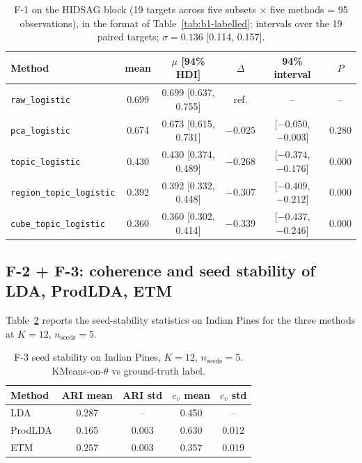 \documentclass[journal,a4paper,10pt]{IEEEtran}
\begin{document}
\begin{table}[t]
\caption{F-1 on the HIDSAG block (19 targets across five subsets
$\times$ five methods = 95 observations), in the format of
Table~\ref{tab:b1-labelled}; intervals over the 19 paired targets;
$\sigma = 0.136$ [0.114, 0.157].}
\label{tab:b1-hidsag}
\centering
\scriptsize
\setlength{\tabcolsep}{3pt}
\begin{tabular}{@{}lccccc@{}}
\toprule
Method & mean & $\mu$ [94\% HDI] & $\Delta$ & 94\% interval & $P$ \\
\midrule
\texttt{raw\_logistic}           & 0.699 & 0.699 [0.637, 0.755] & ref.     & --                   & --    \\
\texttt{pca\_logistic}           & 0.674 & 0.673 [0.615, 0.731] & $-0.025$ & [$-0.050$, $-0.003$] & 0.280 \\
\texttt{topic\_logistic}         & 0.430 & 0.430 [0.374, 0.489] & $-0.268$ & [$-0.374$, $-0.176$] & 0.000 \\
\texttt{region\_topic\_logistic} & 0.392 & 0.392 [0.332, 0.448] & $-0.307$ & [$-0.409$, $-0.212$] & 0.000 \\
\texttt{cube\_topic\_logistic}   & 0.360 & 0.360 [0.302, 0.414] & $-0.339$ & [$-0.437$, $-0.246$] & 0.000 \\
\bottomrule
\end{tabular}
\end{table}

\subsection{F-2 + F-3: coherence and seed stability of LDA, ProdLDA, ETM}
\label{subsec:res-b3}

Table~\ref{tab:b3-seed} reports the seed-stability statistics on
Indian Pines for the three methods at $K = 12$, $n_{\text{seeds}} = 5$.

\begin{table}[t]
\caption{F-3 seed stability on Indian Pines, $K=12$, $n_{\text{seeds}}=5$.
KMeans-on-$\theta$ vs ground-truth label.}
\label{tab:b3-seed}
\centering
\small
\begin{tabular}{lcccc}
\toprule
Method & ARI mean & ARI std & $c_v$ mean & $c_v$ std \\
\midrule
LDA      & 0.287 & --      & 0.450 & -- \\
ProdLDA  & 0.165 & 0.003   & 0.630 & 0.012 \\
ETM      & 0.257 & 0.003   & 0.357 & 0.019 \\
\bottomrule
\end{tabular}
\end{table}
\end{document}
